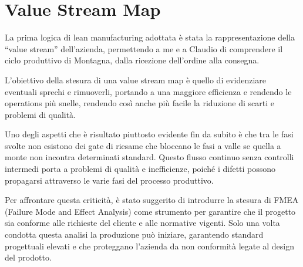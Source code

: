 \section{Value Stream Map}
\begin{multicols}{2}
	La prima logica di lean manufacturing adottata è stata la rappresentazione della “value stream” dell’azienda, permettendo a me e a Claudio di comprendere il ciclo produttivo di Montagna, dalla ricezione dell’ordine alla consegna.

	L’obiettivo della stesura di una value stream map è quello di evidenziare eventuali sprechi e rimuoverli, portando a una maggiore efficienza e rendendo le operations più snelle, rendendo così anche più facile la riduzione di scarti e problemi di qualità.

	Uno degli aspetti che è risultato piuttosto evidente fin da subito è che tra le fasi svolte non esistono dei gate di riesame che bloccano le fasi a valle se quella a monte non incontra determinati standard. Questo flusso continuo senza controlli intermedi porta a problemi di qualità e inefficienze, poiché i difetti possono propagarsi attraverso le varie fasi del processo produttivo.

	Per affrontare questa criticità, è stato suggerito di introdurre la stesura di FMEA (Failure Mode and Effect Analysis) come strumento per garantire che il progetto sia conforme alle richieste del cliente e alle normative vigenti. Solo una volta condotta questa analisi la produzione può iniziare, garantendo standard progettuali elevati e che proteggano l’azienda da non conformità legate al design del prodotto.

\end{multicols}

